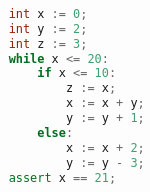 \begin{lstlisting}[language=C++,basicstyle=\ttfamily,keywordstyle=\color{blue}]  % Start your code-block
	
	int x := 0;
	int y := 2;
	int z := 3;
	while x <= 20:
		if x <= 10:
			z := x;
			x := x + y;
			y := y + 1;
		else:
			x := x + 2;
			y := y - 3;
	assert x == 21;
	\end{lstlisting}